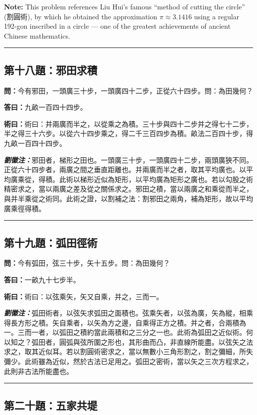 \documentclass[11pt,a4paper]{article}
\newcommand{\wen}[1]{\textbf{\color{problemcolor}問：}#1\par}
\newcommand{\da}[1]{\textbf{答曰：}#1\par}
\newcommand{\shu}[1]{\textbf{術曰：}#1\par}
\newcommand{\liuhui}[1]{{\color{commentarycolor}\textit{\textbf{劉徽注：}}#1\par}}
\begin{document}
\textbf{Note:} This problem references Liu Hui's famous ``method of cutting the circle'' (割圓術), by which he obtained the approximation $\pi \approx 3.1416$ using a regular 192-gon inscribed in a circle --- one of the greatest achievements of ancient Chinese mathematics.

\bigskip
\hrule
\bigskip

\subsection{第十八題：邪田求積}

\wen{今有邪田，一頭廣三十步，一頭廣四十二步，正從六十四步。問：為田幾何？}

\da{九畝一百四十四步。}

\shu{術曰：并兩廣而半之，以從乘之為積。三十步與四十二步并之得七十二步，半之得三十六步。以從六十四步乘之，得二千三百四步為積。畝法二百四十步，得九畝一百四十四步。}

\liuhui{邪田者，梯形之田也。一頭廣三十步，一頭廣四十二步，兩頭廣狹不同。正從六十四步者，兩廣之間之垂直距離也。并兩廣而半之者，取其平均廣也。以平均廣乘從，得積。此術以梯形近似為矩形，以平均廣為矩形之廣也。若以勾股之術精密求之，當以兩廣之差及從之關係求之。邪田之積，當以兩廣之和乘從而半之，與并半乘從之術同。此術之證，以割補之法：割邪田之兩角，補為矩形，故以平均廣乘徑得積。}

\bigskip
\hrule
\bigskip

\subsection{第十九題：弧田徑術}

\wen{今有弧田，弦三十步，矢十五步。問：為田幾何？}

\da{一畝九十七步半。}

\shu{術曰：以弦乘矢，矢又自乘，并之，三而一。}

\liuhui{弧田術者，以弦矢求弧田之面積也。弦乘矢者，以弦為廣，矢為縱，相乘得長方形之積。矢自乘者，以矢為方之邊，自乘得正方之積。并之者，合兩積為一。三而一者，以弧田之積約當此兩積和之三分之一也。此術為弧田之近似術。何以知之？弧田者，圓弧與弦所圍之形也，其形曲而凸，非直線所能盡。以弦矢之法求之，取其近似耳。若以割圓術密求之，當以無數小三角形割之，割之彌細，所失彌少。此術雖為近似，然於古法已足用之。弧田之密術，當以矢之三次方程求之，此則非古法所能盡也。}

\bigskip
\hrule
\bigskip

\subsection{第二十題：五家共堤}
\end{document}
